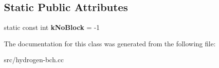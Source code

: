 \subsection*{Static Public Attributes}
\begin{DoxyCompactItemize}
\item 
\hypertarget{classv8_1_1internal_1_1_b_a_s_e___e_m_b_e_d_d_e_d_1_1_element_a6ec6b7de3e5470d5c7a334559959e1a8}{}static const int {\bfseries k\+No\+Block} = -\/1\label{classv8_1_1internal_1_1_b_a_s_e___e_m_b_e_d_d_e_d_1_1_element_a6ec6b7de3e5470d5c7a334559959e1a8}

\end{DoxyCompactItemize}


The documentation for this class was generated from the following file\+:\begin{DoxyCompactItemize}
\item 
src/hydrogen-\/bch.\+cc\end{DoxyCompactItemize}
